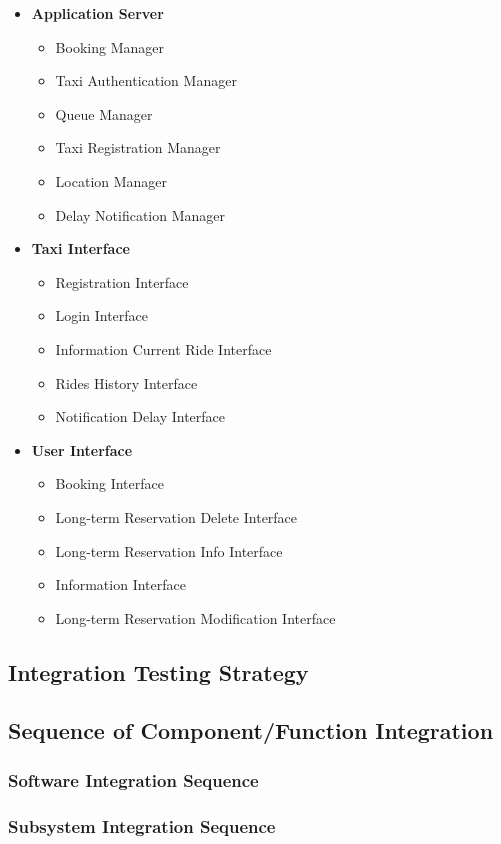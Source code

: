 		\begin{itemize}
			\item \textbf{Application Server}
			\begin{itemize}
				\item Booking Manager
				\item Taxi Authentication Manager
				\item Queue Manager
				\item Taxi Registration Manager
				\item Location Manager
				\item Delay Notification Manager
			\end{itemize}
			\item \textbf{Taxi Interface}
			\begin{itemize}
				\item Registration Interface
				\item Login Interface
				\item Information Current Ride Interface
				\item Rides History Interface
				\item Notification Delay Interface
			\end{itemize}
			\item \textbf{User Interface}
			\begin{itemize}
				\item Booking Interface
				\item Long-term Reservation Delete Interface
				\item Long-term Reservation Info Interface
				\item Information Interface
				\item Long-term Reservation Modification Interface
			\end{itemize}
		\end{itemize}
\subsection{Integration Testing Strategy}
\subsection{Sequence of Component/Function Integration}
\subsubsection{Software Integration Sequence}
\subsubsection{Subsystem Integration Sequence}